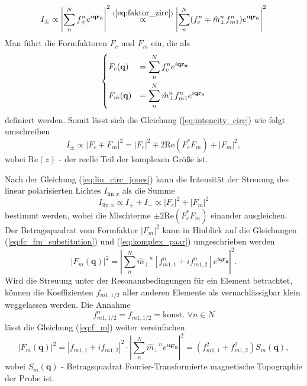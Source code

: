 \begin{equation}
    I_{\pm} \propto \left| \sum_{n}^N f_{\pm}^n e^{i\mathbf{qr_n}} \right|^2 \stackrel{{(\ref{eq:faktor_zirc})}}{\propto} \left| \sum_{n}^N (f_{c}^n\mp {\hat{m}_\perp}^n f_{m1}^n) e^{i\mathbf{qr_n}} \right|^2
    \label{eq:intencity_circ}
\end{equation}
Man führt die Formfaktoren $F_c$ und $F_m$ ein, die als
\begin{equation}
    \begin{dcases}
     F_c(\mathbf{q}) &= \sum^N_n f_c^n e^{i\mathbf{qr_n}}\\
     F_m(\mathbf{q}) &= \sum^N_n {\hat{m}_\perp}^n f_{m1}^n e^{i\mathbf{qr_n}}
    \end{dcases}
    \label{eq:fc_fm_substitution}
\end{equation}
definiert werden. Somit lässt sich die Gleichung (\ref{eq:intencity_circ}) wie folgt umschreiben
\begin{equation}
     I_{\pm} \propto \left| F_c \mp F_m \right|^2 = \left| F_c \right|^2 \mp 2\text{Re}(F_c^*F_m) + \left| F_m \right|^2,
\end{equation}
wobei $\text{Re}(z)$ - der reelle Teil der komplexen Größe ist.

\noindent
Nach der Gleichung (\ref{eq:lin_circ_jones}) kann die Intensität der Streuung des linear polarisierten Lichtes $I_{\text{lin $x$}}$ als die Summe
\begin{equation}
    I_{\text{lin $x$}} \propto I_+ + I_- \propto  \left| F_c \right|^2 + \left| F_m \right|^2
\end{equation}
bestimmt werden, wobei die Mischterme $\pm2\text{Re}(F_c^*F_m)$ einander ausgleichen. Der Betragsquadrat vom Formfaktor $\left|F_m\right|^2$ kann in Hinblick auf die Gleichungen (\ref{eq:fc_fm_substitution}) und (\ref{eq:komplex_paar}) umgeschrieben werden
\begin{equation}
    \left|F_m(\mathbf{q})\right|^2 =  \left|\sum^N_n {\hat{m}_\perp}^n \left[f_{m1,1}^n + if_{m1,2}^n\right] e^{i\mathbf{qr_n}}\right|^2.
    \label{eq:f_m}
\end{equation}
Wird die Streuung unter der Resonanzbedingungen für ein Element betrachtet, können die Koeffizienten $f_{m1,1/2}$ aller anderen Elemente als vernachlässigbar klein weggelassen werden. Die Annahme
\begin{equation}
    f_{m1,1/2}^n = f_{m1,1/2} = \text{konst. } \forall n \in N
\end{equation}
lässt die Gleichung (\ref{eq:f_m}) weiter vereinfachen
\begin{equation}
   \left|F_m(\mathbf{q})\right|^2 = \left|f_{m1,1} + if_{m1,2}\right|^2 \cdot \left|\sum^N_n {\hat{m}_\perp}^n e^{i\mathbf{qr_n}}\right|^2 = (f_{m1,1}^2 + f_{m1,2}^2)S_m(\mathbf{q}),
\end{equation}
wobei $S_m(\mathbf{q})$ - Betragsquadrat Fourier-Transformierte magnetische Topographie der Probe ist.

